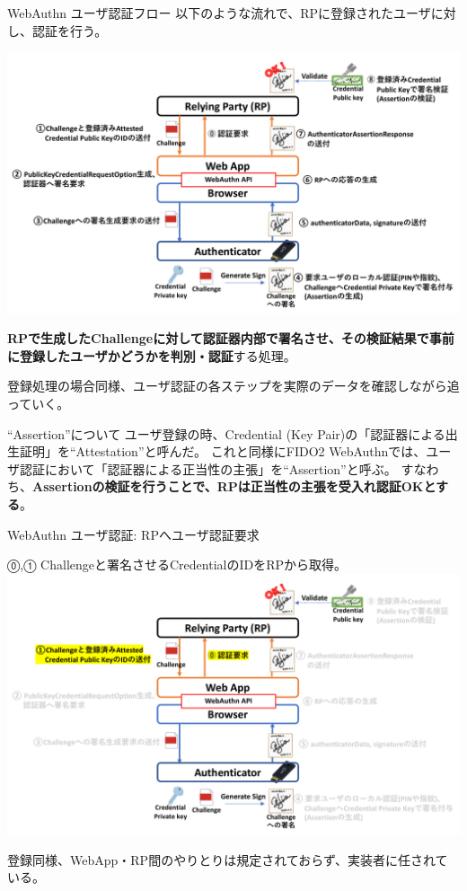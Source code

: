 \documentclass[12pt,dvipdfmx,uplatex]{beamer}
\begin{document}
\begin{frame}{WebAuthn ユーザ認証フロー}
以下のような流れで、RPに登録されたユーザに対し、認証を行う。
\begin{center}
\includegraphics[width=0.9\linewidth]{Figs/webauthn-authentication0.pdf}
\end{center}
\textbf{RPで生成したChallengeに対して認証器内部で署名させ、その検証結果で事前に登録したユーザかどうかを判別・認証}する処理。
\end{frame}

\begin{frame}
登録処理の場合同様、ユーザ認証の各ステップを実際のデータを確認しながら追っていく。

\begin{block}{\small ``Assertion''について}
ユーザ登録の時、Credential (Key Pair)の「認証器による出生証明」を``Attestation''と呼んだ。
これと同様に\alert{FIDO2 WebAuthnでは、ユーザ認証において「認証器による正当性の主張」を``Assertion''と呼ぶ}。
すなわち、\textbf{Assertionの検証を行うことで、RPは正当性の主張を受入れ認証OKとする}。
\end{block}
\end{frame}

\begin{frame}{WebAuthn ユーザ認証: RPへユーザ認証要求}
\begin{center}
⓪,① Challengeと署名させるCredentialのIDをRPから取得。
\includegraphics[width=0.9\linewidth]{Figs/webauthn-authentication1.pdf}
\end{center}
登録同様、WebApp・RP間のやりとりは規定されておらず、実装者に任されている。
\end{frame}
\end{document}
